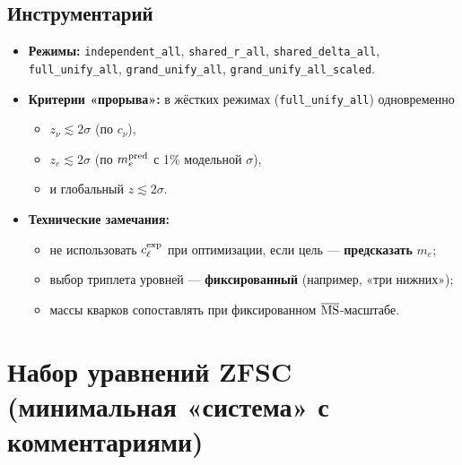 \documentclass[12pt,a4paper]{article}
\begin{document}
\subsection{Инструментарий}
\begin{itemize}
    \item \textbf{Режимы:} \texttt{independent\_all}, \texttt{shared\_r\_all}, \texttt{shared\_delta\_all}, \texttt{full\_unify\_all}, \texttt{grand\_unify\_all}, \texttt{grand\_unify\_all\_scaled}.
    \item \textbf{Критерии «прорыва»:} в жёстких режимах (\texttt{full\_unify\_all}) одновременно
    \begin{itemize}
        \item \(z_\nu \lesssim 2\sigma\) (по \(c_\nu\)),
        \item \(z_e \lesssim 2\sigma\) (по \(m_e^{\rm pred}\) с 1\% модельной \(\sigma\)),
        \item и глобальный \(z \lesssim 2\sigma\).
    \end{itemize}
    \item \textbf{Технические замечания:}
    \begin{itemize}
        \item не использовать \(c_\ell^{\rm exp}\) при оптимизации, если цель — \textbf{предсказать} \(m_e\);
        \item выбор триплета уровней — \textbf{фиксированный} (например, «три нижних»);
        \item массы кварков сопоставлять при фиксированном \(\overline{\rm MS}\)-масштабе.
    \end{itemize}
\end{itemize}

\section{Набор уравнений ZFSC (минимальная «система» с комментариями)}
\end{document}
